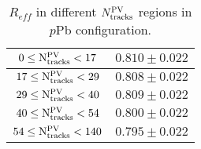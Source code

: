 \begin{table}[H]
\centering
\caption{$R_{eff}$ in different $N_{\rm tracks}^{\rm PV}$ regions in $p$Pb configuration.}
\begin{center}
\begin{tabular}{c|c}
\hline
$0 \leq \mathrm{N_{\rm tracks}^{\rm PV}} < 17$ & $0.810 \pm 0.022$ \\
\hline
$17 \leq \mathrm{N_{\rm tracks}^{\rm PV}} < 29$ & $0.808 \pm 0.022$ \\
\hline
$29 \leq \mathrm{N_{\rm tracks}^{\rm PV}} < 40$ & $0.809 \pm 0.022$ \\
\hline
$40 \leq \mathrm{N_{\rm tracks}^{\rm PV}} < 54$ & $0.800 \pm 0.022$ \\
\hline
$54 \leq \mathrm{N_{\rm tracks}^{\rm PV}} < 140$ & $0.795 \pm 0.022$ \\
\hline
\end{tabular}
\end{center}
\label{ReffTable_NBack_pPb}
\end{table}
